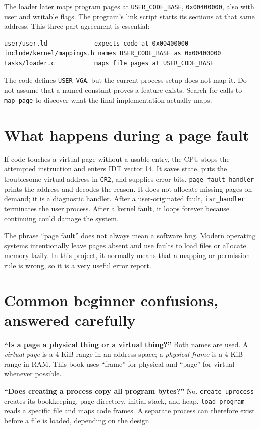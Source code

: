 The loader later maps program pages at \texttt{USER\_CODE\_BASE}, \texttt{0x00400000}, also with user and writable flags. The program's link script starts its sections at that same address. This three-part agreement is essential:
\begin{verbatim}
user/user.ld             expects code at 0x00400000
include/kernel/mappings.h names USER_CODE_BASE as 0x00400000
tasks/loader.c           maps file pages at USER_CODE_BASE
\end{verbatim}

The code defines \texttt{USER\_VGA}, but the current process setup does not map it. Do not assume that a named constant proves a feature exists. Search for calls to \texttt{map\_page} to discover what the final implementation actually maps.

\section{What happens during a page fault}
If code touches a virtual page without a usable entry, the CPU stops the attempted instruction and enters IDT vector 14. It saves state, puts the troublesome virtual address in \texttt{CR2}, and supplies error bits. \texttt{page\_fault\_handler} prints the address and decodes the reason. It does not allocate missing pages on demand; it is a diagnostic handler. After a user-originated fault, \texttt{isr\_handler} terminates the user process. After a kernel fault, it loops forever because continuing could damage the system.

The phrase ``page fault'' does not always mean a software bug. Modern operating systems intentionally leave pages absent and use faults to load files or allocate memory lazily. In this project, it normally means that a mapping or permission rule is wrong, so it is a very useful error report.

\section{Common beginner confusions, answered carefully}
\textbf{``Is a page a physical thing or a virtual thing?''} Both names are used. A \emph{virtual page} is a 4 KiB range in an address space; a \emph{physical frame} is a 4 KiB range in RAM. This book uses ``frame'' for physical and ``page'' for virtual whenever possible.

\textbf{``Does creating a process copy all program bytes?''} No. \texttt{create\_uprocess} creates its bookkeeping, page directory, initial stack, and heap. \texttt{load\_program} reads a specific file and maps code frames. A separate process can therefore exist before a file is loaded, depending on the design.


